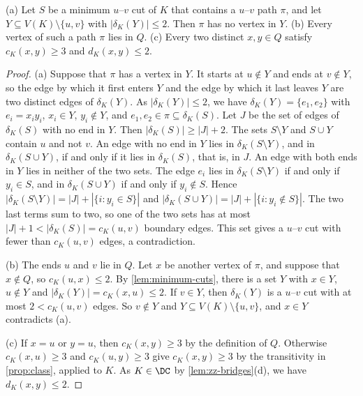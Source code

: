 \begin{lemma}
\label{lem:zz-paths-in-q}
(a) Let $S$ be a minimum $u$--$v$ cut of $K$ that contains a $u$--$v$ path $\pi$, and let $Y \subseteq V(K) \setminus \{u, v\}$ with $|\delta_K(Y)| \leq 2$.
Then $\pi$ has no vertex in $Y$.
(b) Every vertex of such a path $\pi$ lies in $Q$.
(c) Every two distinct $x, y \in Q$ satisfy $c_K(x, y) \geq 3$ and $d_K(x, y) \leq 2$.
\end{lemma}

\begin{proof}
(a) Suppose that $\pi$ has a vertex in $Y$.
It starts at $u \notin Y$ and ends at $v \notin Y$, so the edge by which it first enters $Y$ and the edge by which it last leaves $Y$ are two distinct edges of $\delta_K(Y)$.
As $|\delta_K(Y)| \leq 2$, we have $\delta_K(Y) = \{e_1, e_2\}$ with $e_i = x_i y_i$, $x_i \in Y$, $y_i \notin Y$, and $e_1, e_2 \in \pi \subseteq \delta_K(S)$.
Let $J$ be the set of edges of $\delta_K(S)$ with no end in $Y$.
Then $|\delta_K(S)| \geq |J| + 2$.
The sets $S \setminus Y$ and $S \cup Y$ contain $u$ and not $v$.
An edge with no end in $Y$ lies in $\delta_K(S \setminus Y)$, and in $\delta_K(S \cup Y)$, if and only if it lies in $\delta_K(S)$, that is, in $J$.
An edge with both ends in $Y$ lies in neither of the two sets.
The edge $e_i$ lies in $\delta_K(S \setminus Y)$ if and only if $y_i \in S$, and in $\delta_K(S \cup Y)$ if and only if $y_i \notin S$.
Hence $|\delta_K(S \setminus Y)| = |J| + |\{i : y_i \in S\}|$ and $|\delta_K(S \cup Y)| = |J| + |\{i : y_i \notin S\}|$.
The two last terms sum to two, so one of the two sets has at most $|J| + 1 < |\delta_K(S)| = c_K(u, v)$ boundary edges.
This set gives a $u$--$v$ cut with fewer than $c_K(u, v)$ edges, a contradiction.

(b) The ends $u$ and $v$ lie in $Q$.
Let $x$ be another vertex of $\pi$, and suppose that $x \notin Q$, so $c_K(u, x) \leq 2$.
By \cref{lem:minimum-cuts}, there is a set $Y$ with $x \in Y$, $u \notin Y$ and $|\delta_K(Y)| = c_K(x, u) \leq 2$.
If $v \in Y$, then $\delta_K(Y)$ is a $u$--$v$ cut with at most $2 < c_K(u, v)$ edges.
So $v \notin Y$ and $Y \subseteq V(K) \setminus \{u, v\}$, and $x \in Y$ contradicts (a).

(c) If $x = u$ or $y = u$, then $c_K(x, y) \geq 3$ by the definition of $Q$.
Otherwise $c_K(x, u) \geq 3$ and $c_K(u, y) \geq 3$ give $c_K(x, y) \geq 3$ by the transitivity in \cref{prop:class}, applied to $K$.
As $K \in \DC$ by \cref{lem:zz-bridges}(d), we have $d_K(x, y) \leq 2$.
\end{proof}

